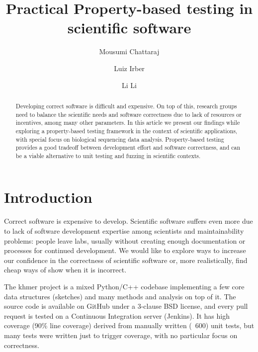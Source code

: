 \documentclass[preprint,nocopyrightspace]{sig-alternate}
\begin{document}
%

\title{Practical Property-based testing in scientific software}

\author{Mousumi Chattaraj}
\author{Luiz Irber}
\author{Li Li}


\maketitle

\begin{abstract}

Developing correct software is difficult and expensive.
On top of this, research groups need to balance the scientific needs and software correctness due to lack of resources or incentives,
among many other parameters.
In this article we present our findings while exploring a property-based testing framework in the context of scientific applications,
with special focus on biological sequencing data analysis.
Property-based testing provides a good tradeoff between development effort and software correctness,
and can be a viable alternative to unit testing and fuzzing in scientific contexts.

\end{abstract}

\section{Introduction}
Correct software is expensive to develop.
Scientific software suffers even more due to lack of software development expertise among scientists and maintainability problems:
people leave labs,
usually without creating enough documentation or processes for continued development.
We would like to explore ways to increase our confidence in the correctness of scientific software or,
more realistically,
find cheap ways of show when it is incorrect.

The khmer project is a mixed Python/C++ codebase implementing a few core data structures (sketches) and many methods and analysis on top of it.
The source code is available on GitHub under a 3-clause BSD license,
and every pull request is tested on a Continuous Integration server (Jenkins).
It has high coverage (90\% line coverage) derived from manually written (~600) unit tests,
but many tests were written just to trigger coverage,
with no particular focus on correctness.
\end{document}
